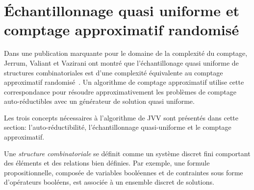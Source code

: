 \chapter{Échantillonnage quasi uniforme et comptage approximatif randomisé}

Dans une publication marquante pour le domaine de la complexité du comptage, Jerrum, Valiant et Vazirani ont montré que l'échantillonage quasi uniforme de structures combinatoriales est d'une complexité équivalente au comptage approximatif randomisé~\cite{jerrumRandomGenerationCombinatorial1986}. Un algorithme de comptage approximatif utilise cette correspondance pour résoudre approximativement les problèmes de comptage auto-réductibles avec un générateur de solution quasi uniforme.

Les trois concepts nécessaires à l'algorithme de JVV sont présentés dans cette section: l'auto-réductibilité, l'échantillonnage quasi-uniforme et le comptage approximatif.

Une \textit{structure combinatoriale} se définit comme un système discret fini comportant des éléments et des relations bien définies. Par exemple, une formule propositionnelle, composée de variables booléennes et de contraintes sous forme d'opérateurs booléens, est associée à un ensemble discret de solutions.

